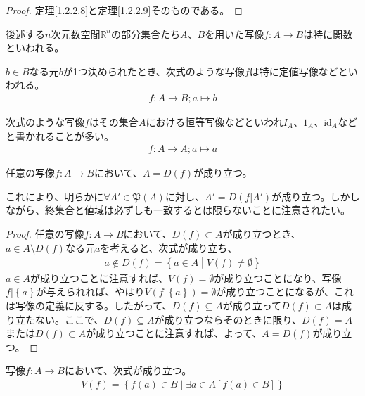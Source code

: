 \documentclass[dvipdfmx]{jsarticle}
\begin{document}
\begin{proof}
定理\ref{1.2.2.8}と定理\ref{1.2.2.9}そのものである。
\end{proof}
\begin{dfn}
後述する$n$次元数空間$\mathbb{R}^{n}$の部分集合たち$A$、$B$を用いた写像$f:A \rightarrow B$は特に関数といわれる。
\end{dfn}
\begin{dfn}
$b \in B$なる元$b$が1つ決められたとき、次式のような写像$f$は特に定値写像などといわれる。
\begin{align*}
f:A \rightarrow B;a \mapsto b
\end{align*}
\end{dfn}
\begin{dfn}
次式のような写像$f$はその集合$A$における恒等写像などといわれ$I_{A}$、$1_{A}$、$\mathrm{id}_{A}$などと書かれることが多い。
\begin{align*}
f:A \rightarrow A;a \mapsto a
\end{align*}
\end{dfn}
\begin{thm}
\label{1.2.3.4}
任意の写像$f:A \rightarrow B$において、$A = D(f)$が成り立つ。
\end{thm}\par
これにより、明らかに$\forall A'\in \mathfrak{P}(A)$に対し、$A' = D\left( f|A' \right)$が成り立つ。しかしながら、終集合と値域は必ずしも一致するとは限らないことに注意されたい。
\begin{proof}
任意の写像$f:A \rightarrow B$において、$D(f) \subset A$が成り立つとき、$a \in A \setminus D(f)$なる元$a$を考えると、次式が成り立ち、
\begin{align*}
a \notin D(f) = \left\{ a \in A \middle| V(f) \neq \emptyset \right\}
\end{align*}
$a \in A$が成り立つことに注意すれば、$V(f) = \emptyset$が成り立つことになり、写像$f|\left\{ a \right\}$が与えられれば、やはり$V\left( f|\left\{ a \right\} \right) = \emptyset$が成り立つことになるが、これは写像の定義に反する。したがって、$D(f) \subseteq A$が成り立って$D(f) \subset A$は成り立たない。ここで、$D(f) \subseteq A$が成り立つならそのときに限り、$D(f) = A$または$D(f) \subset A$が成り立つことに注意すれば、よって、$A = D(f)$が成り立つ。
\end{proof}
\begin{thm}
\label{1.2.3.5}
写像$f:A \rightarrow B$において、次式が成り立つ。
\begin{align*}
V(f) = \left\{ f(a) \in B \middle| \exists a \in A\left[ f(a) \in B \right] \right\}
\end{align*}
\end{thm}
\end{document}
